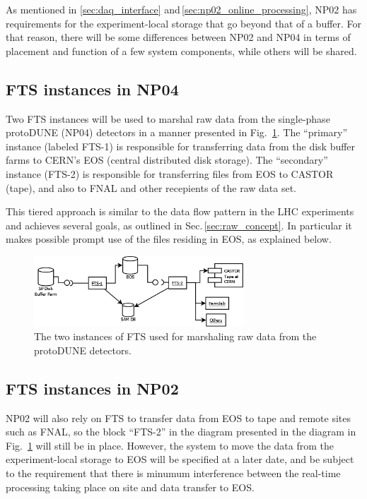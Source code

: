 \documentclass[12pt]{article}
\begin{document}
\noindent As mentioned in \ref{sec:daq_interface} and\,\ref{sec:np02_online_processing},
NP02 has requirements for the experiment-local storage that go beyond
that of a buffer. For that reason, there will be some differences between
NP02 and NP04 in terms of placement and function of a few system components,
while others will be shared.

\subsection{FTS instances in NP04}
\label{sec:prim_sec}
Two FTS instances will be used to marshal raw data from the single-phase protoDUNE (NP04)
detectors in a manner presented in Fig.~\ref{fig:ftsinstances}.  The
``primary'' instance (labeled FTS-1) is responsible for transferring data
from the disk buffer farms to CERN's EOS (central distributed disk storage).
 The ``secondary'' instance (FTS-2) is responsible for transferring files from EOS to
CASTOR (tape), and also to FNAL and other recepients of the raw data set.

This tiered approach is similar to the data flow pattern in the LHC experiments and achieves several goals,
as outlined in Sec.\,\ref{sec:raw_concept}. In particular
it makes possible prompt use of the files residing in EOS, as explained below.

\begin{figure}[tbh]
  \centering
  \includegraphics[width=0.7\textwidth]{figures/ftsinstances_v2.png}
  \caption{The two instances of FTS used for marshaling raw data from the protoDUNE detectors.}
  \label{fig:ftsinstances}
\end{figure}

\subsection{FTS instances in NP02}
NP02 will also rely on FTS to transfer data from EOS to tape and remote sites such as FNAL,
so the block ``FTS-2'' in the diagram presented in the diagram in Fig.~\ref{fig:ftsinstances} will still be in place.
However, the system to move the data from the experiment-local storage to EOS will be specified at a later date,
and be subject to the requirement that there is minumum interference between the real-time processing
taking place on site and data transfer to EOS.
\end{document}
